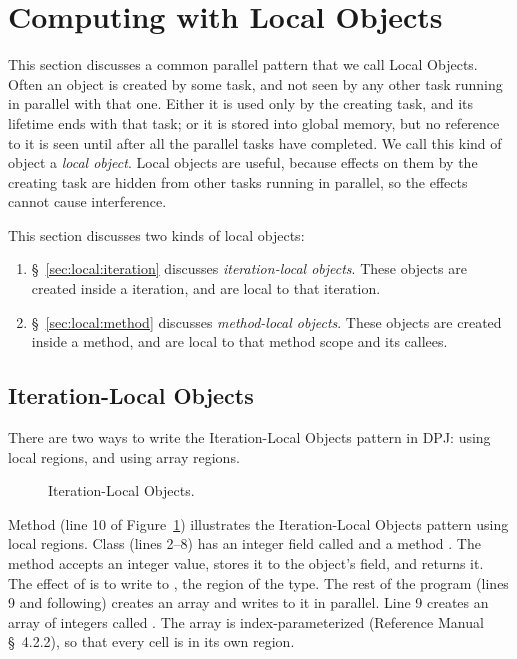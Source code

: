 \section{Computing with Local Objects%
\label{sec:local}}

This section discusses a common parallel pattern that we call Local
Objects.  Often an object is created by some task, and not seen by any
other task running in parallel with that one.  Either it is used only
by the creating task, and its lifetime ends with that task; or it is
stored into global memory, but no reference to it is seen until after
all the parallel tasks have completed.  We call this kind of object a
\emph{local object}.  Local objects are useful, because effects on
them by the creating task are hidden from other tasks running in
parallel, so the effects cannot cause interference.

This section discusses two kinds of local objects:
%
\begin{enumerate}
%
\item \S~\ref{sec:local:iteration} discusses \emph{iteration-local
  objects}.  These objects are created inside a 
  iteration, and are local to that iteration.
%
\item \S~\ref{sec:local:method} discusses \emph{method-local objects}.
  These objects are created inside a method, and are local to that
  method scope and its callees.
%
\end{enumerate}
%


\subsection{Iteration-Local Objects%
\label{sec:local:iteration}}

There are two ways to write the Iteration-Local Objects pattern in
DPJ: using local regions, and using array regions.

\begin{figure}

\caption{Iteration-Local Objects.}
\label{fig:local:iteration:pattern}
\end{figure}

 Method
 (line 10 of
Figure~\ref{fig:local:iteration:pattern}) illustrates the
Iteration-Local Objects pattern using local regions.  Class
 (lines 2--8) has an integer field called 
and a method .  The  method
accepts an integer value, stores it to the object's  field,
and returns it.  The effect of  is to write to
, the region of the  type.  The rest of the
program (lines 9 and following) creates an array and writes to it in
parallel.  Line 9 creates an array of integers called .
The array is index-parameterized (Reference Manual \S~4.2.2), so that
every cell is in its own region.

